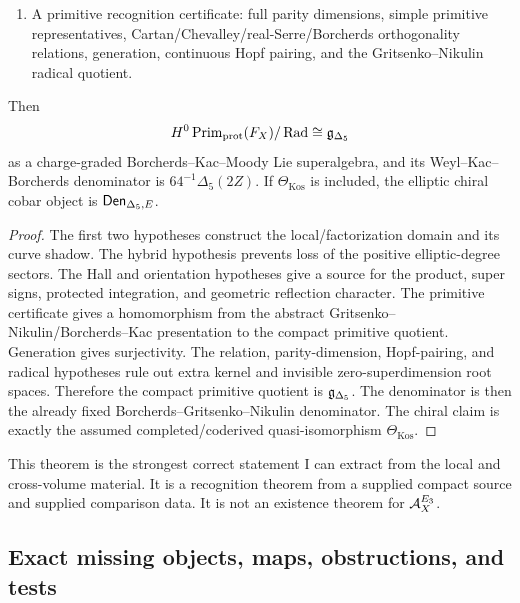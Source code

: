 \begin{theorem}
\begin{enumerate}
\[
        \Theta_{\operatorname{Kos}}:
        \Omega_E^{\operatorname{ch}}C_X
        \xrightarrow{\ \simeq\ }
        \DDelta .
\]
\item A primitive recognition certificate: full parity dimensions, simple
primitive representatives, Cartan/Chevalley/real-Serre/Borcherds
orthogonality relations, generation, continuous Hopf pairing, and the
Gritsenko--Nikulin radical quotient.
\end{enumerate}
Then
\[
        H^0\operatorname{Prim}_{\operatorname{prot}}(F_X)/\operatorname{Rad}
        \cong
        \mathfrak g_{\Delta_5}
\]
as a charge-graded Borcherds--Kac--Moody Lie superalgebra, and its
Weyl--Kac--Borcherds denominator is \(64^{-1}\Delta_5(2Z)\).  If
\(\Theta_{\operatorname{Kos}}\) is included, the elliptic chiral cobar
object is \(\mathsf{Den}_{\Delta_5,E}\).
\end{theorem}

\begin{proof}
The first two hypotheses construct the local/factorization domain and its
curve shadow.  The hybrid hypothesis prevents loss of the positive
elliptic-degree sectors.  The Hall and orientation hypotheses give a
source for the product, super signs, protected integration, and geometric
reflection character.  The primitive certificate gives a homomorphism from
the abstract Gritsenko--Nikulin/Borcherds--Kac presentation to the compact
primitive quotient.  Generation gives surjectivity.  The relation,
parity-dimension, Hopf-pairing, and radical hypotheses rule out extra
kernel and invisible zero-superdimension root spaces.  Therefore the
compact primitive quotient is \(\mathfrak g_{\Delta_5}\).  The denominator is then the
already fixed Borcherds--Gritsenko--Nikulin denominator.  The chiral claim
is exactly the assumed completed/coderived quasi-isomorphism
\(\Theta_{\operatorname{Kos}}\).
\end{proof}

This theorem is the strongest correct statement I can extract from the
local and cross-volume material.  It is a recognition theorem from a
supplied compact source and supplied comparison data.  It is not an
existence theorem for \(\mathcal A^{E_3}_X\).

\subsection{Exact missing objects, maps, obstructions, and tests}

